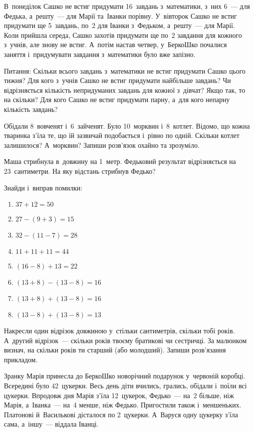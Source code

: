 \problem
В~понеділок Сашко не встиг придумати 16~завдань з~математики,
з~них 6~--- для Федька, а~решту~--- для Марії та~Іванки порівну.
У~вівторок Сашко не встиг придумати ще 5~завдань,
по~2 для Іванки з~Федьком, а~решту~--- для Марії.
Коли прийшла середа, Сашко захотів придумати
ще по~2 завдання для кожного з~учнів, але знову не встиг.
А~потім настав четвер, у~БеркоШко почалися заняття
і~придумувати завдання з~математики було вже запізно.

Питання:
Скільки всього завдань з~математики не встиг придумати Сашко цього тижня?
Для кого з~учнів Сашко не встиг придумати найбільше завдань?
Чи відрізняється кількість непридуманих завдань для кожної з~дівчат?
Якщо так, то на скільки?
Для кого Сашко не встиг придумати парну, а~для кого непарну кількість завдань?


\problem
Обідали 8~вовченят і~6~зайченят. Було 10~морквин і~8~котлет.
Відомо, що кожна тваринка з'їла те, що їй зазвичай подобається
і~рівно по одній.
Скільки котлет залишилося? А~морквин? Запиши розв'язок охайно та зрозуміло.


\problem
Маша стрибнула в~довжину на 1~метр.
Федьковий результат відрізняється на 23~сантиметри.
На яку відстань стрибнув Федько?


\problem
Знайди і~виправ помилки:
\begin{multicols}{2}
    \begin{enumerate}
        \item $37 + 12 = 50$
        \item $27 - (9 + 3) = 15$
        \item $32 - (11 - 7) = 28$
        \item $11 + 11 + 11 = 44$
        \item $(16 - 8) + 13 = 22$
        \item $(13 + 8) - (13 - 8) = 16$
        \item $(13 + 8) + (13 - 8) = 16$
        \item $(13 - 8) + (13 - 8) = 13$
    \end{enumerate}
\end{multicols}


\problem
Накресли один відрізок довжиною у~стільки сантиметрів, скільки тобі років.
А~другий відрізок~--- скільки років твоєму братикові чи сестричці.
За малюнком визнач, на скільки років ти старший (або молодший).
Запиши розв’язання прикладом.


\problem
Зранку Марія принесла до БеркоШко новорічний подарунок у~червоній коробці.
Всередині було 42~цукерки.
Весь день діти вчились, грались, обідали і~поїли всі цукерки.
Впродовж дня Марія з’їла 12~цукерок, Федько~--- на~2 більше, ніж Марія,
а~Іванка~--- на~4 менше, ніж Федько.
Пригостили також і~меншеньких. Платонові й~Василькові дісталося по 2~цукерки.
А~Варуся одну цукерку з’їла сама, а~іншу~--- віддала Іванці.

